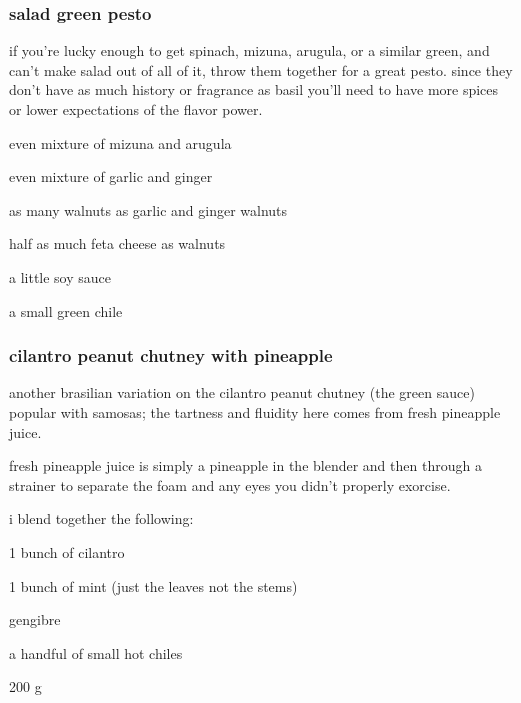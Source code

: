 \subsubsection{salad green pesto}

if you're lucky enough to get spinach, mizuna, arugula, or a similar green, and 
can't make salad out of all of it, throw them together for a great pesto. since 
they don't have as much history or fragrance as basil you'll need to have more 
spices or lower expectations of the flavor power.

\begin{ingredients}
  \item even mixture of mizuna and arugula
  \item even mixture of garlic and ginger
  \item as many walnuts as garlic and ginger walnuts
  \item half as much feta cheese as walnuts
  \item a little soy sauce
  \item a small green chile
\end{ingredients}

\subsubsection{cilantro peanut chutney with pineapple}

another brasilian variation on the cilantro peanut chutney (the green sauce) 
popular with samosas; the tartness and fluidity here comes from fresh pineapple 
juice.

fresh pineapple juice is simply a pineapple in the blender and then through a 
strainer to separate the foam and any eyes you didn't properly exorcise.

i blend together the following:

\begin{ingredients}
  \item 1 bunch of cilantro
  \item 1 bunch of mint (just the leaves not the stems) 
  \item \onehalf {}
  \item \gls{gengibre}
  \item a handful of small hot chiles
  \item 200 g 
\end{ingredients}

